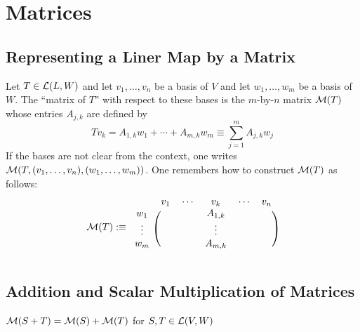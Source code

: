 \section{Matrices}
\subsection{Representing a Liner Map by a Matrix}

\setcounter{thm}{30}
\begin{mydef}
  \label{def: matrix of a linear map}
  Let $T \in \mathcal{L} (L,W)$ and let $v_1, \dots, v_n$ be a basis of $V$ and let $w_1, \dots, w_m$ be a basis of $W$. The ``matrix of $T$'' with respect to these bases is the $m$-by-$n$ matrix $\mathcal{M}(T)$ whose entries $A_{j,k}$ are defined by
  \begin{equation}
    T v_k = A_{1,k} w_1 + \cdots + A_{m,k} w_m \equiv \sum_{j=1}^{m} A_{j,k} w_j
  \end{equation}
  If the bases are not clear from the context, one writes $\mathcal{M}(T, (v_1, \dots, v_n),(w_1, \dots, w_m))$. One remembers how to construct $\mathcal{M}(T)$ as follows:
  \begin{equation}
    \mathcal{M} (T) :\equiv
      \begin{blockarray}{cccccc}
                 & v_1 & \cdots & v_k     & \cdots & v_n \\
        \begin{block}{c(ccccc)}
          w_1    &     &        & A_{1,k} &        &     \\
          \vdots &     &        & \vdots  &        &     \\
          w_m    &     &        & A_{m,k} &        &     \\
        \end{block}
      \end{blockarray}
  \end{equation}
\end{mydef}

\subsection{Addition and Scalar Multiplication of Matrices}

\setcounter{thm}{34}
\begin{thm}
  $\mathcal{M}(S+T) = \mathcal{M}(S) + \mathcal{M}(T)$ for $S, T \in \mathcal{L} (V,W)$
\end{thm}

